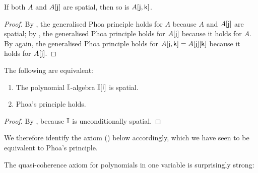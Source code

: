 \begin{corollary}\label{cor:A-and-Ax-qc-to-Axy-qc}
  If both $A$ and $A[\mathsf{j}]$ are spatial, then so is $A[\mathsf{j},\mathsf{k}]$.
\end{corollary}
\begin{proof}
  By , the generalised Phoa principle holds for $A$ because $A$ and $A[\mathsf{j}]$ are spatial; by , the generalised Phoa principle holds for $A[\mathsf{j}]$ because it holds for $A$.  By  again, the generalised Phoa principle holds for $A[\mathsf{j},\mathsf{k}] = A[\mathsf{j}][\mathsf{k}]$ because it holds for $A[\mathsf{j}]$.
\end{proof}

\begin{corollary}\label{cor:phoa-vs-quasicoherence}
  The following are equivalent:
  \begin{enumerate}
    \item The polynomial $\mathbb{I}$-algebra $\mathbb{I}[\mathsf{i}]$ is spatial.
    \item Phoa's principle holds.
  \end{enumerate}
\end{corollary}

\begin{proof}
  By , because $\mathbb{I}$ is unconditionally spatial.
\end{proof}


We therefore identify the axiom (\AxiomSQCP) below accordingly, which we have seen to be equivalent to Phoa's principle.

\PrintAxiomSQCP


The quasi-coherence axiom for polynomials in one variable is surprisingly strong:



